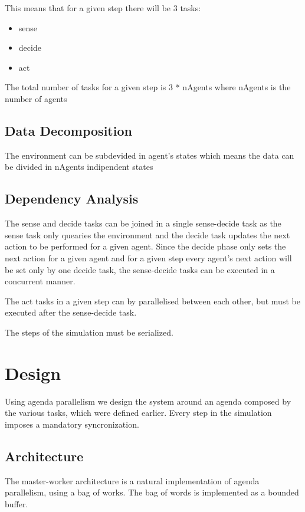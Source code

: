 \documentclass[12pt, a4paper]{report}
\begin{document}
This means that for a given step there will be 3 tasks:
\begin{itemize}
    \item sense
    \item decide
    \item act
\end{itemize}

The total number of tasks for a given step is 3 * nAgents
 where nAgents is the number of agents

\section{Data Decomposition}
The environment can be subdevided in agent's states which
 means the data can be divided in nAgents indipendent states

\section{Dependency Analysis}
The sense and decide tasks can be joined in a single
 sense-decide task as the sense task only quearies the
 environment and the decide task updates the next action
 to be performed for a given agent. Since the decide phase
 only sets the next action for a given agent and for a
 given step every agent's next action will be set only
 by one decide task, the sense-decide tasks can be executed
 in a concurrent manner.

The act tasks in a given step can by parallelised between each other, but
 must be executed after the sense-decide task.

The steps of the simulation must be serialized.

\chapter{Design}
Using agenda parallelism we design the system around an agenda
 composed by the various tasks, which were defined earlier. Every
 step in the simulation imposes a mandatory syncronization.

\section{Architecture}
The master-worker architecture is a natural implementation of
 agenda parallelism, using a bag of works. The bag of words is
 implemented as a bounded buffer.
\end{document}
